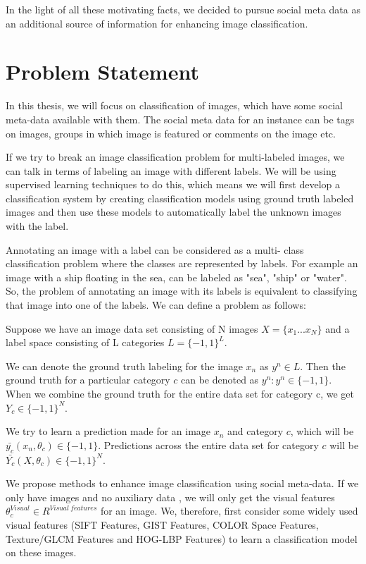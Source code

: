  In the light of all these motivating facts, we decided to pursue
social meta data as an additional source of information for
enhancing image classification.

\section{Problem Statement}
In this thesis, we will focus on classification of images, which
have some social meta-data available with them. The social meta data
for an instance can be  tags on images, groups in which image is
featured or comments on the image etc.

If we try to break an image classification problem for multi-labeled
images, we can talk in terms of labeling an image with different
labels. We will be using supervised learning techniques to do this,
which means we will first develop a classification system by
creating classification models using ground truth labeled images and then
use these models to automatically label the unknown images with the
label.

Annotating an image  with a label can be considered as a multi-
class classification problem where the classes are represented by
labels. For example an image with a ship floating in the sea, can be labeled
as "sea", "ship" or "water". So, the problem of annotating an image
with its labels is equivalent to classifying that image into one of
the labels. We can define a problem as follows:

	Suppose we have an image data set consisting of N images $X = \{x_1 ...x_N\}$ and a label space consisting of L categories $L = \{-1, 1\}^L$.
	
	We can denote the ground truth labeling for the image $x_n$ as $y^n\in L$. Then the ground truth for a particular category $c$ can be denoted as $y^n:y^n \in \{-1,1\}$. When we combine the ground truth for the entire data set for category c, we get $Y_c \in \{-1,1\}^N$.
	
We try to learn a prediction made for an image $x_n$ and category $c$,
which will be $\bar{y_c} (x_n,\theta_c)\in\{-1,1\} $. Predictions
across the entire data set for category $c$ will be
$\bar{Y_c}(X,\theta_c) \in \{-1,1\}^N$.
	
	 We propose methods to enhance image classification using
social meta-data. If we only have images and no auxiliary data ,
we will only get the visual features  $\theta_c ^ {Visual} \in R^{Visual\ features}$ for an image. We, therefore, first consider some widely used visual features (SIFT Features, GIST Features,  COLOR Space Features, Texture/GLCM Features and HOG-LBP Features) to learn a classification model on these images.
	
